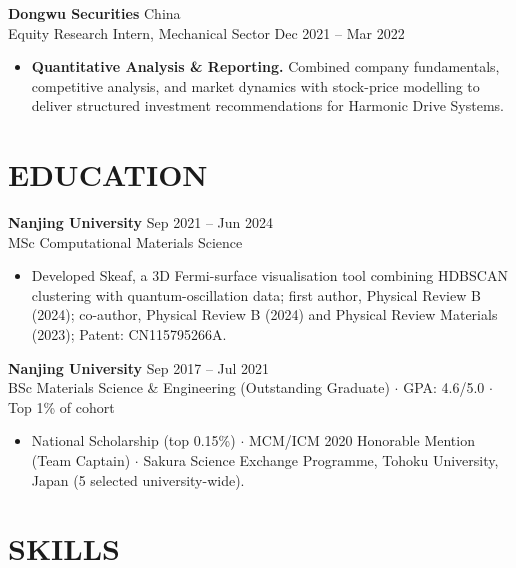 \documentclass[a4paper,10pt]{article}
\begin{document}
\vspace{2pt}
\noindent\textbf{Dongwu Securities} \hfill China\\
Equity Research Intern, Mechanical Sector \hfill Dec 2021 -- Mar 2022
\begin{itemize}
    \item \textbf{Quantitative Analysis \& Reporting.} Combined company fundamentals, competitive analysis, and market dynamics with stock-price modelling to deliver structured investment recommendations for Harmonic Drive Systems.
\end{itemize}

\section{EDUCATION}

\noindent\textbf{Nanjing University} \hfill Sep 2021 -- Jun 2024\\
MSc Computational Materials Science
\begin{itemize}
    \item Developed Skeaf, a 3D Fermi-surface visualisation tool combining HDBSCAN clustering with quantum-oscillation data; first author, Physical Review B (2024); co-author, Physical Review B (2024) and Physical Review Materials (2023); Patent: CN115795266A.
\end{itemize}

\vspace{2pt}
\noindent\textbf{Nanjing University} \hfill Sep 2017 -- Jul 2021\\
BSc Materials Science \& Engineering (Outstanding Graduate) \;$\cdot$\; GPA: 4.6/5.0 \;$\cdot$\; Top 1\% of cohort
\begin{itemize}
    \item National Scholarship (top 0.15\%) \;$\cdot$\; MCM/ICM 2020 Honorable Mention (Team Captain) \;$\cdot$\; Sakura Science Exchange Programme, Tohoku University, Japan (5 selected university-wide).
\end{itemize}

\section{SKILLS}
\end{document}
